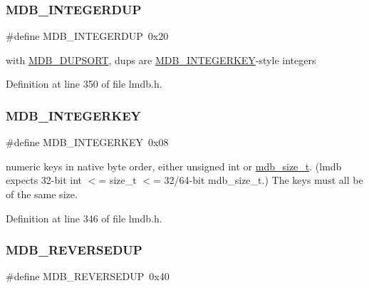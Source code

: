 \subsubsection{\texorpdfstring{M\+D\+B\+\_\+\+I\+N\+T\+E\+G\+E\+R\+D\+UP}{MDB\_INTEGERDUP}}
{\footnotesize\ttfamily \#define M\+D\+B\+\_\+\+I\+N\+T\+E\+G\+E\+R\+D\+UP~0x20}

with \mbox{\hyperlink{group__mdb__dbi__open_gae0626566c2562e9007f5c8c9535bab1a}{M\+D\+B\+\_\+\+D\+U\+P\+S\+O\+RT}}, dups are \mbox{\hyperlink{group__mdb__dbi__open_ga219c5c50d41902fca79c68d8836e7753}{M\+D\+B\+\_\+\+I\+N\+T\+E\+G\+E\+R\+K\+EY}}-\/style integers 

Definition at line 350 of file lmdb.\+h.

\mbox{\label{group__mdb__dbi__open_ga219c5c50d41902fca79c68d8836e7753}} 
\subsubsection{\texorpdfstring{M\+D\+B\+\_\+\+I\+N\+T\+E\+G\+E\+R\+K\+EY}{MDB\_INTEGERKEY}}
{\footnotesize\ttfamily \#define M\+D\+B\+\_\+\+I\+N\+T\+E\+G\+E\+R\+K\+EY~0x08}

numeric keys in native byte order, either unsigned int or \mbox{\hyperlink{lmdb_8h_a78821971e612e3898ef4b3ae45ed86f1}{mdb\+\_\+size\+\_\+t}}. (lmdb expects 32-\/bit int $<$= size\+\_\+t $<$= 32/64-\/bit mdb\+\_\+size\+\_\+t.) The keys must all be of the same size. 

Definition at line 346 of file lmdb.\+h.

\mbox{\label{group__mdb__dbi__open_gaf99ce592b75d65e23503f78a7933c297}} 
\subsubsection{\texorpdfstring{M\+D\+B\+\_\+\+R\+E\+V\+E\+R\+S\+E\+D\+UP}{MDB\_REVERSEDUP}}
{\footnotesize\ttfamily \#define M\+D\+B\+\_\+\+R\+E\+V\+E\+R\+S\+E\+D\+UP~0x40}


